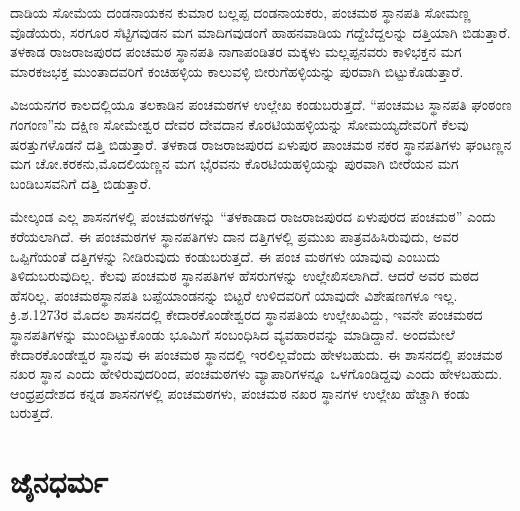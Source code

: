 ದಾಡಿಯ ಸೋಮೆಯ ದಂಡನಾಯಕನ ಕುಮಾರ ಬಲ್ಲಪ್ಪ ದಂಡನಾಯಕರು, ಪಂಚಮಠ ಸ್ಥಾನಪತಿ ಸೋಮಣ್ಣ ವೊಡೆಯರು, ಸರಗೂರ ಸೆಟ್ಟಿಗವುಡನ ಮಗ ಮಾದಿಗವುಡಂಗೆ ಹಾಹನವಾಡಿಯ ಗದ್ದೆಬೆದ್ದಲನ್ನು ದತ್ತಿಯಾಗಿ ಬಿಡುತ್ತಾರೆ. ತಳಕಾಡ ರಾಜರಾಜಪುರದ ಪಂಚಮಠ ಸ್ಥಾನಪತಿ ನಾಗಾಪಂಡಿತರ ಮಕ್ಕಳು ಮಲ್ಲಪ್ಪನವರು ಕಾಳಿಭಕ್ತನ ಮಗ ಮಾರಕಜಭಕ್ತ ಮುಂತಾದವರಿಗೆ ಕಂಚಿಹಳ್ಳಿಯ ಕಾಲುವಳ್ಳಿ ಬೀರುಗೆಹಳ್ಳಿಯನ್ನು ಪುರವಾಗಿ ಬಿಟ್ಟುಕೊಡುತ್ತಾರೆ.

ವಿಜಯನಗರ ಕಾಲದಲ್ಲಿಯೂ ತಲಕಾಡಿನ ಪಂಚಮಠಗಳ ಉಲ್ಲೇಖ ಕಂಡುಬರುತ್ತದೆ. “ಪಂಚಮಟ ಸ್ಥಾನಪತಿ ಘಂಠಂಣ ಗಂಗಂಣ”ನು ದಕ್ಷಿಣ ಸೋಮೇಶ್ವರ ದೇವರ ದೇವದಾನ ಕೊರಟಿಯಹಳ್ಳಿಯನ್ನು ಸೋಮಯ್ಯದೇವರಿಗೆ ಕೆಲವು ಷರತ್ತುಗಳೊಡನೆ ದತ್ತಿ ಬಿಡುತ್ತಾರೆ. ತಳಕಾಡ ರಾಜರಾಜಪುರದ ಏಳುಪುರ ಪಾಂಚಮಠ ನಕರ ಸ್ಥಾನಪತಿಗಳು ಘಂಟಣ್ಣನ ಮಗ ಚೋ.ಕರಕನು,ಮೊದಲಿಯಣ್ಣನ ಮಗ ಭೈರವನು ಕೊರಟಿಯಹಳ್ಳಿಯನ್ನು ಪುರವಾಗಿ ಬೀರೆಯನ ಮಗ ಬಂಡಿಬಸವನಿಗೆ ದತ್ತಿ ಬಿಡುತ್ತಾರೆ.

ಮೇಲ್ಕಂಡ ಎಲ್ಲ ಶಾಸನಗಳಲ್ಲಿ ಪಂಚಮಠಗಳನ್ನು “ತಳಕಾಡಾದ ರಾಜರಾಜಪುರದ ಏಳುಪುರದ ಪಂಚಮಠ” ಎಂದು ಕರೆಯಲಾಗಿದೆ. ಈ ಪಂಚಮಠಗಳ ಸ್ಥಾನಪತಿಗಳು ದಾನ ದತ್ತಿಗಳಲ್ಲಿ ಪ್ರಮುಖ ಪಾತ್ರವಹಿಸಿರುವುದು, ಅವರ ಒಪ್ಪಿಗೆಯಂತೆ ದತ್ತಿಗಳನ್ನು ನೀಡಿರುವುದು ಕಂಡುಬರುತ್ತದೆ. ಈ ಪಂಚ ಮಠಗಳು ಯಾವುವು ಎಂಬುದು ತಿಳಿದುಬರುವುದಿಲ್ಲ. ಕೆಲವು ಪಂಚಮಠ ಸ್ಥಾನಪತಿಗಳ ಹೆಸರುಗಳನ್ನು ಉಲ್ಲೇಖಿಸಲಾಗಿದೆ. ಆದರೆ ಅವರ ಮಠದ ಹೆಸರಿಲ್ಲ. ಪಂಚಮಠಸ್ಥಾನಪತಿ ಬಪ್ಪೆಯಾಂಡನನ್ನು ಬಿಟ್ಟರೆ ಉಳಿದವರಿಗೆ ಯಾವುದೇ ವಿಶೇಷಣಗಳೂ ಇಲ್ಲ. ಕ್ರಿ.ಶ.1273ರ ಮೊದಲ ಶಾಸನದಲ್ಲಿ ಕೇದಾರಕೊಂಡೇಶ್ವರದ ಸ್ಥಾನಪತಿಯ ಉಲ್ಲೇಖವಿದ್ದು, ಇವನೇ ಪಂಚಮಠದ ಸ್ಥಾನಪತಿಗಳನ್ನು ಮುಂದಿಟ್ಟುಕೊಂಡು ಭೂಮಿಗೆ ಸಂಬಂಧಿಸಿದ ವ್ಯವಹಾರವನ್ನು ಮಾಡಿದ್ದಾನೆ. ಅಂದಮೇಲೆ ಕೇದಾರಕೊಂಡೇಶ್ವರ ಸ್ಥಾನವು ಈ ಪಂಚಮಠ ಸ್ಥಾನದಲ್ಲಿ ಇರಲಿಲ್ಲವೆಂದು ಹೇಳಬಹುದು. ಈ ಶಾಸನದಲ್ಲಿ ಪಂಚಮಠ ನಖರ ಸ್ಥಾನ ಎಂದು ಹೇಳಿರುವುದರಿಂದ, ಪಂಚಮಠಗಳು ವ್ಯಾಪಾರಿಗಳನ್ನೂ ಒಳಗೊಂಡಿದ್ದವು ಎಂದು ಹೇಳಬಹುದು. ಆಂಧ್ರಪ್ರದೇಶದ ಕನ್ನಡ ಶಾಸನಗಳಲ್ಲಿ ಪಂಚಮಠಗಳು, ಪಂಚಮಠ ನಖರ ಸ್ಥಾನಗಳ ಉಲ್ಲೇಖ ಹೆಚ್ಚಾಗಿ ಕಂಡು ಬರುತ್ತದೆ.


\section{ಜೈನಧರ್ಮ}


